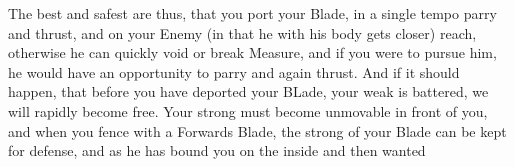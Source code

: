 The best and safest are thus, that you port your Blade, in a single
tempo parry and thrust, and on your Enemy (in that he with his body
gets closer) reach, otherwise he can quickly void or break Measure,
and if you were to pursue him, he would have an opportunity to parry
and again thrust. And if it should happen, that before you have
deported your BLade, your weak is battered, we will rapidly become
free. Your strong must become unmovable in front of you, and when you
fence with a Forwards Blade, the strong of your Blade can be kept for
defense, and as he has bound you on the inside and then wanted